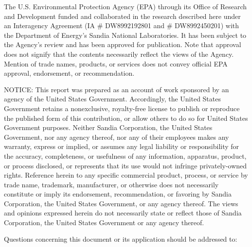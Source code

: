 The U.S. Environmental Protection Agency (EPA) through its Office of 
Research and Development funded and collaborated in the research described 
here under an Interagency Agreement (IA \# DW8992192801 and \# DW8992450201) with the Department 
of Energy's Sandia National Laboratories. It has been subject to the Agency's 
review and has been approved for publication. Note that approval does not 
signify that the contents necessarily reflect the views of the Agency. 
Mention of trade names, products, or services does not convey official 
EPA approval, endorsement, or recommendation.

\bigskip
\bigskip

{\selectfont NOTICE:} 
This report was prepared as an account of work sponsored
by an agency of the United States Government. Accordingly, the United
States Government retains a nonexclusive, royalty-free license to
publish or reproduce the published form of this contribution, or allow
others to do so for United States Government purposes. Neither Sandia
Corporation, the United States Government, nor any agency thereof, nor
any of their employees makes any warranty, express or implied, or
assumes any legal liability or responsibility for the accuracy,
completeness, or usefulness of any information, apparatus, product, or
process disclosed, or represents that its use would not infringe
privately-owned rights. Reference herein to any specific commercial
product, process, or service by trade name, trademark, manufacturer,
or otherwise does not necessarily constitute or imply its endorsement,
recommendation, or favoring by Sandia Corporation, the United States
Government, or any agency thereof. The views and opinions expressed
herein do not necessarily state or reflect those of Sandia
Corporation, the United States Government or any agency thereof.

\bigskip
\bigskip

Questions concerning this document or its application should be
addressed to:

